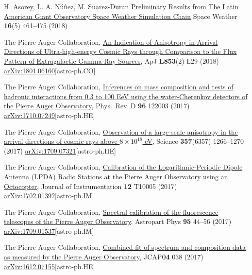 \begin{etaremune}
\item {}H. Asorey, L. A. Núñez, M. Suarez-Duran \href{https://doi.org/10.1002/2017SW001774}{{Preliminary Results from The Latin American Giant Observatory Space Weather Simulation Chain}} Space Weather {\textbf{16}}(5) 461--475 (2018) %

\item {}The Pierre Auger Collaboration, \href{https://doi.org/10.3847/2041-8213/aaa66d}{{An Indication of Anisotropy in Arrival Directions of Ultra-high-energy Cosmic Rays through Comparison to the Flux Pattern of Extragalactic Gamma-Ray Sources}}, ApJ {\textbf{L853}}(2) L29 (2018) \href{https://arxiv.org/abs/1801.06160}{arXiv:1801.06160}[astro-ph.CO]
	
\item {}The Pierre Auger Collaboration, \href{https://doi.org/10.1103/PhysRevD.96.122003}{{Inferences on mass composition and tests of hadronic interactions from 0.3 to 100 EeV using the water-Cherenkov detectors of the Pierre Auger Observatory}}, Phys.\ Rev\  D {\textbf{96}} 122003 (2017) \href{https://arxiv.org/abs/1710.07249}{arXiv:1710.07249}[astro-ph.HE]

\item {}The Pierre Auger Collaboration, \href{https://doi.org/10.1126/science.aan4338}{{Observation of a large-scale anisotropy in the arrival directions of cosmic rays above $8\times 10^{18}$ eV}}, Science {\textbf{357}}(6357) 1266--1270 (2017) \href{https://arxiv.org/abs/1709.07321}{arXiv:1709.07321}[astro-ph.HE]

\item {}The Pierre Auger Collaboration, \href{https://doi.org/10.1088/1748-0221/12/10/T10005}{{Calibration of the Logarithmic-Periodic Dipole Antenna (LPDA) Radio Stations at the Pierre Auger Observatory using an Octocopter}}, Journal of Instrumentation {\textbf{12}} T10005 (2017) \href{http://arxiv.org/abs/1702.01392}{arXiv:1702.01392}[astro-ph.IM]

\item {}The Pierre Auger Collaboration, \href{https://doi.org/10.1016/j.astropartphys.2017.09.001}{{Spectral calibration of the fluorescence telescopes of the Pierre Auger Observatory}}, Astropart Phys {\textbf{95}} 44--56 (2017) \href{https://arxiv.org/abs/1709.01537}{arXiv:1709.01537}[astro-ph.IM]

\item {}The Pierre Auger Collaboration, \href{https://doi.org/10.1088/1475-7516/2017/04/038}{{Combined fit of spectrum and composition data as measured by the Pierre Auger Observatory}}, JCAP{\textbf{04}} 038 (2017) \href{http://arxiv.org/abs/1612.07155}{arXiv:1612.07155}[astro-ph.HE]


\end{etaremune}
